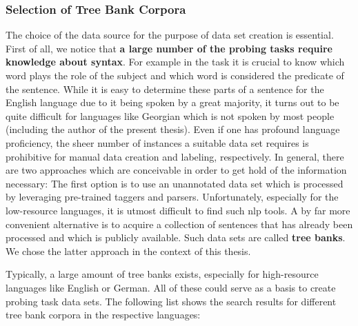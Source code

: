 \subsubsection{Selection of Tree Bank Corpora}
\label{sec:selection_corpora}

The choice of the data source for the purpose of data set creation is essential. First of all, we notice that \textbf{a large number of the probing tasks require knowledge about syntax}. For example in the  task it is crucial to know which word plays the role of the subject and which word is considered the predicate of the sentence. While it is easy to determine these parts of a sentence for the English language due to it being spoken by a great majority, it turns out to be quite difficult for languages like Georgian which is not spoken by most people (including the author of the present thesis). Even if one has profound language proficiency, the sheer number of instances a suitable data set requires is prohibitive for manual data creation and labeling, respectively. In general, there are two approaches which are conceivable in order to get hold of the information necessary:  The first option is to use an unannotated data set which is processed by leveraging pre-trained taggers and parsers. Unfortunately, especially for the low-resource languages, it is utmost difficult to find such \gls{nlp} tools.  A by far more convenient alternative is to acquire a collection of sentences that has already been processed and which is publicly available. Such data sets are called \textbf{tree banks}. We chose the latter approach in the context of this thesis.

Typically, a large amount of tree banks exists, especially for high-resource languages like English or German. All of these could serve as a basis to create probing task data sets. The following list shows the search results for different tree bank corpora in the respective languages:

